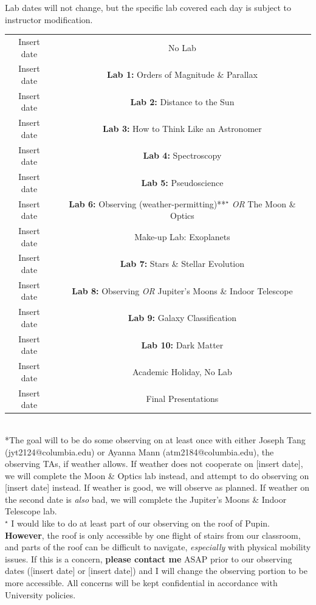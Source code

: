 \documentclass[11pt]{article}
\begin{document}
Lab dates will not change, but the specific lab covered each day is subject to instructor modification. \\

\begin{tabular}{cc}
    Insert date & No Lab \\ 
    Insert date & \textbf{Lab 1:} Orders of Magnitude \& Parallax \\ 
    Insert date & \textbf{Lab 2:} Distance to the Sun \\ 
    Insert date & \textbf{Lab 3:} How to Think Like an Astronomer \\
    Insert date & \textbf{Lab 4:} Spectroscopy \\
    Insert date & \textbf{Lab 5:} Pseudoscience \\ 
    Insert date & \textbf{Lab 6:} Observing (weather-permitting)**$^{\star}$ \textit{OR} The Moon \& Optics \\ 
    Insert date & Make-up Lab: Exoplanets \\ 
    Insert date & \textbf{Lab 7:} Stars \& Stellar Evolution \\ 
    Insert date & \textbf{Lab 8:} Observing \textit{OR} Jupiter's Moons \& Indoor Telescope \\
    Insert date & \textbf{Lab 9:}  Galaxy Classification \\
    Insert date & \textbf{Lab 10:} Dark Matter\\
    Insert date & Academic Holiday, No Lab \\
    Insert date & Final Presentations  \\ 
\end{tabular} \\

\noindent **The goal will to be do some observing on at least once with either Joseph Tang (jyt2124@columbia.edu) or Ayanna Mann (atm2184@columbia.edu), the observing TAs, if weather allows. If weather does not cooperate on [insert date], we will complete the Moon \& Optics lab instead, and attempt to do observing on [insert date] instead. If weather is good, we will observe as planned. If weather on the second date is \textit{also} bad, we will complete the Jupiter's Moons \& Indoor Telescope lab. \\

\noindent $^{\star}$ I would like to do at least part of our observing on the roof of Pupin. \textbf{However}, the roof is only accessible by one flight of stairs from our classroom, and parts of the roof can be difficult to navigate, \textit{especially} with physical mobility issues. If this is a concern, \textbf{please contact me} ASAP prior to our observing dates ([insert date] or [insert date]) and I will change the observing portion to be more accessible. All concerns will be kept confidential in accordance with University policies.
\end{document}
